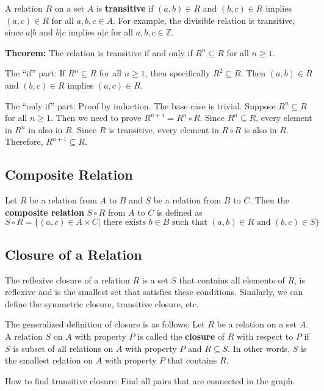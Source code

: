 \documentclass[a4paper,12pt]{article}
\begin{document}
A relation $R$ on a set $A$ is \textbf{transitive} if $(a,b) \in R$ and $(b,c) \in R$ implies $(a,c) \in R$ for all $a,b,c \in A$.
For example, the divisible relation is transitive, since $a|b$ and $b|c$ implies $a|c$ for all $a,b,c \in \mathbb{Z}$.

\textbf{Theorem:}
The relation is transitive if and only if $R^n \subseteq R$ for all $n \geq 1$.

The ``if'' part:
If $R^n \subseteq R$ for all $n \geq 1$, then specifically $R^2 \subseteq R$.
Then $(a,b) \in R$ and $(b,c) \in R$ implies $(a,c) \in R$.

The ``only if'' part:
Proof by induction.
The base case is trivial.
Suppose $R^n \subseteq R$ for all $n \geq 1$.
Then we need to prove $R^{n+1} = R^n \circ R$.
Since $R^n \subseteq R$, every element in $R^n$ in also in $R$.
Since $R$ is transitive, every element in $R \circ R$ is also in $R$.
Therefore, $R^{n+1} \subseteq R$.

\subsection{Composite Relation}

Let $R$ be a relation from $A$ to $B$ and $S$ be a relation from $B$ to $C$.
Then the \textbf{composite relation} $S \circ R$ from $A$ to $C$ is defined as
\begin{equation*}
	S \circ R = \{(a,c) \in A \times C | \text{ there exists } b \in B \text{ such that } (a,b) \in R \text{ and } (b,c) \in S\}
\end{equation*}

\subsection{Closure of a Relation}

The reflexive closure of a relation $R$ is a set $S$ that contains all elements of $R$, is reflexive and is the smallest set that satisfies these conditions.
Similarly, we can define the symmetric closure, transitive closure, etc.

The generalized definition of closure is as follows:
Let $R$ be a relation on a set $A$.
A relation $S$ on $A$ with property $P$ is called the \textbf{closure} of $R$ with respect to $P$ if $S$ is subset of all relations on $A$ with property $P$ and $R \subseteq S$.
In other words, $S$ is the smallest relation on $A$ with property $P$ that contains $R$.

How to find transitive closure:
Find all pairs that are connected in the graph.
\end{document}
